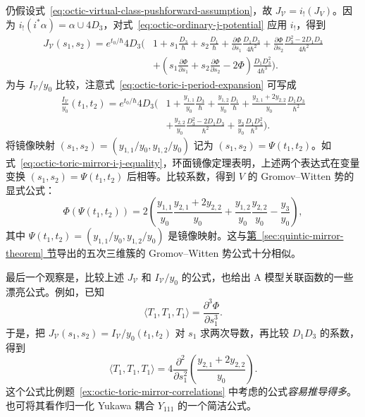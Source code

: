 \begin{example}
仍假设式~\eqref{eq:octic-virtual-class-pushforward-assumption}，故 $J_{\mathcal V}=i_!(J_V)$。因为 $i_!(i^*\alpha)=\alpha\cup4D_3$，对式~\eqref{eq:octic-ordinary-j-potential} 应用 $i_!$，得到
\[
\begin{aligned}
J_{\mathcal V}(s_1,s_2)=e^{t_0/\hbar}4D_3\Biggl(&1+s_1\frac{D_3}{\hbar}+s_2\frac{D_1}{\hbar}
+\frac{\partial\Phi}{\partial s_1}\frac{D_1D_3}{4\hbar^2}
+\frac{\partial\Phi}{\partial s_2}\frac{D_3^2-2D_1D_3}{4\hbar^2}\\
&+\left(s_1\frac{\partial\Phi}{\partial s_1}+s_2\frac{\partial\Phi}{\partial s_2}-2\Phi\right)\frac{D_1D_3^2}{4\hbar^3}\Biggr).
\end{aligned}
\]
为与 $I_{\mathcal V}/y_0$ 比较，注意式~\eqref{eq:octic-toric-i-period-expansion} 可写成
\[
\begin{aligned}
\frac{I_{\mathcal V}}{y_0}(t_1,t_2)=e^{t_0/\hbar}4D_3\Biggl(&1+\frac{y_{1,1}}{y_0}\frac{D_3}{\hbar}+\frac{y_{1,2}}{y_0}\frac{D_1}{\hbar}
+\frac{y_{2,1}+2y_{2,2}}{y_0}\frac{D_1D_3}{\hbar^2}\\
&+\frac{y_{2,2}}{y_0}\frac{D_3^2-2D_1D_3}{\hbar^2}+\frac{y_3}{y_0}\frac{D_1D_3^2}{\hbar^3}\Biggr).
\end{aligned}
\]
将镜像映射 $(s_1,s_2)=(y_{1,1}/y_0,y_{1,2}/y_0)$ 记为 $(s_1,s_2)=\Psi(t_1,t_2)$。如式~\eqref{eq:octic-toric-mirror-i-j-equality}，环面镜像定理表明，上述两个表达式在变量变换 $(s_1,s_2)=\Psi(t_1,t_2)$ 后相等。比较系数，得到 $V$ 的 Gromov--Witten 势的显式公式：
\begin{equation}\label{eq:octic-toric-mirror-potential}
\Phi(\Psi(t_1,t_2))=2\left(\frac{y_{1,1}}{y_0}\frac{y_{2,1}+2y_{2,2}}{y_0}
+\frac{y_{1,2}}{y_0}\frac{y_{2,2}}{y_0}-\frac{y_3}{y_0}\right),
\end{equation}
其中 $\Psi(t_1,t_2)=(y_{1,1}/y_0,y_{1,2}/y_0)$ 是镜像映射。这与\hyperref[sec:quintic-mirror-theorem]{第~\ref*{sec:quintic-mirror-theorem} 节}导出的五次三维簇的 Gromov--Witten 势公式十分相似。

最后一个观察是，比较上述 $J_{\mathcal V}$ 和 $I_{\mathcal V}/y_0$ 的公式，也给出 A 模型关联函数的一些漂亮公式。例如，已知
\[
\langle T_1,T_1,T_1\rangle=\frac{\partial^3\Phi}{\partial s_1^3}.
\]
于是，把 $J_{\mathcal V}(s_1,s_2)=I_{\mathcal V}/y_0(t_1,t_2)$ 对 $s_1$ 求两次导数，再比较 $D_1D_3$ 的系数，得到
\begin{equation}\label{eq:octic-yukawa-period-second-derivative}
\langle T_1,T_1,T_1\rangle=4\frac{\partial^2}{\partial s_1^2}\left(\frac{y_{2,1}+2y_{2,2}}{y_0}\right).
\end{equation}
这个公式比例题~\ref{ex:octic-toric-mirror-correlations} 中考虑的公式\emph{容易推导得多}。也可将其看作归一化 Yukawa 耦合 $Y_{111}$ 的一个简洁公式。


\end{example}

